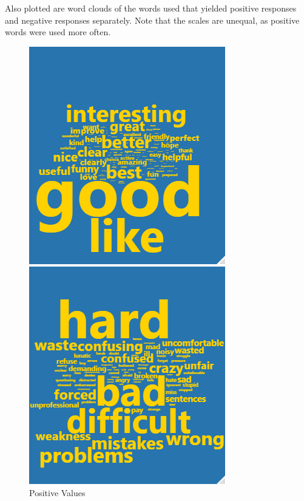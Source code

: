 \documentclass[12pt,letterpaper]{article}
\begin{document}
Also plotted are word clouds of the words used that yielded positive responses and negative responses separately. Note that the scales are unequal, as positive words were used more often.

\begin{figure}[!bp]
  \centering
  \begin{minipage}[b]{0.4\textwidth}
    \includegraphics[width=\textwidth]{Plots/good_cloud.png}
    \caption{Positive Values}
  \end{minipage}
  \hfill
  \begin{minipage}[b]{0.4\textwidth}
    \includegraphics[width=\textwidth]{Plots/bad_cloud.png}

\end{minipage}
\end{figure}
\end{document}
